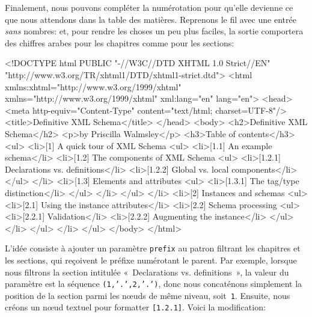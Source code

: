 Finalement, nous pouvons compléter la numérotation pour qu'elle
devienne ce que nous attendons dans la table des matières. Reprenons
le fil avec une entrée \emph{sans} nombres:
\noindent et, pour rendre les choses un peu plus faciles, la sortie
comportera des chiffres arabes pour les chapitres comme pour les sections:
\begin{sverb}
<!DOCTYPE html
  PUBLIC "-//W3C//DTD XHTML 1.0 Strict//EN"
         "http://www.w3.org/TR/xhtml1/DTD/xhtml1-strict.dtd">
<html xmlns:xhtml="http://www.w3.org/1999/xhtml"
      xmlns="http://www.w3.org/1999/xhtml"
      xml:lang="en" lang="en">
  <head><meta http-equiv="Content-Type"
              content="text/html; charset=UTF-8"/>
        <title>Definitive XML Schema</title>
  </head>
  <body>
    <h2>Definitive XML Schema</h2>
    <p>by Priscilla Walmsley</p>
    <h3>Table of contents</h3>
    <ul>
      <li>[1] A quick tour of XML Schema
        <ul>
          <li>[1.1] An example schema</li>
          <li>[1.2] The components of XML Schema
            <ul>
              <li>[1.2.1] Declarations vs. definitions</li>
              <li>[1.2.2] Global vs. local components</li>
            </ul>
          </li>
          <li>[1.3] Elements and attributes
            <ul>
              <li>[1.3.1] The tag/type distinction</li>
            </ul>
          </li>
        </ul>
      </li>
      <li>[2] Instances and schemas
        <ul>
          <li>[2.1] Using the instance attributes</li>
          <li>[2.2] Schema processing
            <ul>
              <li>[2.2.1] Validation</li>
              <li>[2.2.2] Augmenting the instance</li>
            </ul>
          </li>
        </ul>
      </li>
    </ul>
  </body>
</html>
\end{sverb}
L'idée consiste à ajouter un paramètre \texttt{prefix} au patron
filtrant les chapitres et les sections, qui reçoivent le préfixe
numérotant le parent. Par exemple, lorsque nous filtrons la section
intitulée «~Declarations vs. definitions~», la valeur du paramètre est
la séquence \texttt{(1,'.',2,'.')}, donc nous concaténons simplement
la position de la section parmi les nœuds de même niveau,
soit~\texttt{1}. Ensuite, nous créons un nœud textuel pour
formatter \texttt{[1.2.1]}. Voici la modification:
